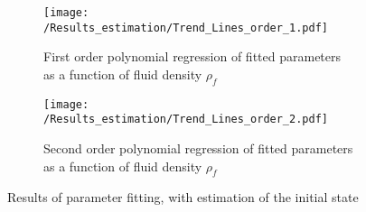 \documentclass[../Article_Model_Parameters.tex]{subfiles}
\begin{document}
	\begin{figure*}
	\centering
	\begin{subfigure}[b]{0.85\textwidth}
		\centering
		\texttt{[image: /Results\_estimation/Trend\_Lines\_order\_1.pdf]}
		\caption{First order polynomial regression of fitted parameters as a function of fluid density $\rho_f$}
	\end{subfigure}
	\hfill
	\begin{subfigure}[b]{0.85\textwidth}
		\centering
		\texttt{[image: /Results\_estimation/Trend\_Lines\_order\_2.pdf]}
		\caption{Second order polynomial regression of fitted parameters as a function of fluid density $\rho_f$}
	\end{subfigure}
	\caption{Results of parameter fitting, with estimation of the initial state}
\end{figure*}
		
	
\end{document}

